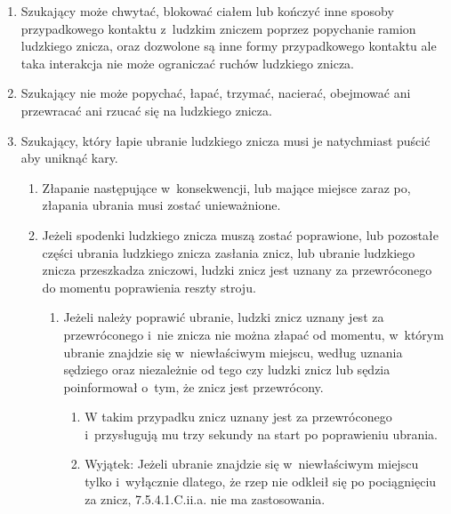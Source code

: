 \documentclass[12pt]{article}
\begin{document}
\begin{enumerate}
	\item
	      Szukający może chwytać, blokować ciałem lub kończyć inne sposoby
	      przypadkowego kontaktu z~ludzkim zniczem poprzez popychanie ramion
	      ludzkiego znicza, oraz dozwolone są inne formy przypadkowego kontaktu
	      ale taka interakcja nie może ograniczać ruchów ludzkiego znicza.
	\item
	      Szukający nie może popychać, łapać, trzymać, nacierać, obejmować ani
	      przewracać ani rzucać się na ludzkiego znicza.
	\item
	      Szukający, który łapie ubranie ludzkiego znicza musi je natychmiast
	      puścić aby uniknąć kary.

	      \begin{enumerate}
		      \item
		            Złapanie następujące w~konsekwencji, lub mające miejsce zaraz po,
		            złapania ubrania musi zostać unieważnione.
		      \item
		            Jeżeli spodenki ludzkiego znicza muszą zostać poprawione, lub
		            pozostałe części ubrania ludzkiego znicza zasłania znicz, lub
		            ubranie ludzkiego znicza przeszkadza zniczowi, ludzki znicz jest
		            uznany za przewróconego do momentu poprawienia reszty stroju.

		            \begin{enumerate}
			            \item
			                  Jeżeli należy poprawić ubranie, ludzki znicz uznany jest za
			                  przewróconego i~nie znicza nie można złapać od momentu, w~którym
			                  ubranie znajdzie się w~niewłaściwym miejscu, według uznania
			                  sędziego oraz niezależnie od tego czy ludzki znicz lub sędzia
			                  poinformował o~tym, że znicz jest przewrócony.

			                  \begin{enumerate}
				                  \item
				                        W takim przypadku znicz uznany jest za przewróconego i~przysługują mu trzy sekundy na start po poprawieniu ubrania.
				                  \item
				                        Wyjątek: Jeżeli ubranie znajdzie się w~niewłaściwym miejscu
				                        tylko i~wyłącznie dlatego, że rzep nie odkleił się po
				                        pociągnięciu za znicz, 7.5.4.1.C.ii.a. nie ma zastosowania.
			                  \end{enumerate}
		            \end{enumerate}
	      \end{enumerate}
\end{enumerate}
\end{document}

